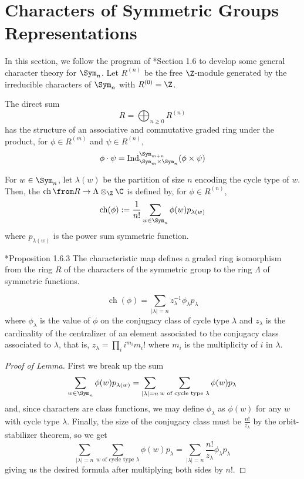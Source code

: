 \documentclass[11pt,leqno,oneside]{amsart}
\numberwithin{thm}{section}
\newcommand{\sym}{\Lambda}
\newcommand{\ch}{\operatorname{ch}}
\newcommand{\Ind}{\operatorname{Ind}}
\begin{document}
\section{Characters of Symmetric Groups Representations}
In this section, we follow the program of \cite{manivel}*{Section
  1.6} to develop some general character theory for \(\Sym_n\). Let
\(R^{(n)}\) be the free \(\Z\)-module generated by the 
irreducible 
characters of \(\Sym_n\) with \(R^{(0)} = \Z\).
\begin{prop}
  The direct sum \[
    R = \bigoplus_{n \geq 0} R^{(n)}
  \]
  has the structure of an associative and commutative graded ring
  under the product, for \(\phi \in R^{(m)}\) and \(\psi \in R^{(n)}\),
  \[
    \phi \cdot \psi = \Ind_{\Sym_m \times \Sym_n}^{\Sym_{m+n}}(\phi
    \times \psi)
  \]
\end{prop}
\begin{defn}
  For \(w \in \Sym_n\), let \(\lambda(w)\) be the partition of size
  \(n\) encoding the cycle type of \(w\). Then, the  \(\ch \from R \to \sym \otimes_\Z 
  \C\) is defined by, for \(\phi \in R^{(n)}\), \[
    \ch(\phi) := \frac{1}{n!} \sum_{w \in \Sym_n} \phi(w) p_{\lambda(w)}
  \]
  where \(p_{\lambda(w)}\) is the power sum symmetric function.
\end{defn}
\begin{thm}
  \cite{manivel}*{Proposition 1.6.3} The characteristic map defines a
  graded ring isomorphism from the 
  ring \(R\) of the characters of the symmetric group to the ring
  \(\sym\) of symmetric functions.
\end{thm}
\begin{lem}
  \[
    \ch(\phi) = \sum_{|\lambda|=n} z_\lambda^{-1} \phi_\lambda p_\lambda
  \]
  where \(\phi_\lambda\) is the value of \(\phi\) on the conjugacy
  class of cycle type \(\lambda\) and \(z_{\lambda}\) is the
  cardinality of the centralizer of an 
  element associated to the conjugacy class associated to
  \(\lambda\), that is, \(z_{\lambda} = \prod_{i} i^{m_i} m_i!\) where
  \(m_i\) is the multiplicity of \(i\) in \(\lambda\).
\end{lem}
\begin{proof}[Proof of Lemma]
  First we break up the sum \[
    \sum_{w \in \Sym_n} \phi(w) p_{\lambda(w)} = \sum_{|\lambda|=n}
    \sum_{w \text{ of cycle type }\lambda}  \phi(w) p_\lambda
  \]
  and, since characters are class functions, we may define
  \(\phi_\lambda\) as \(\phi(w)\) for any \(w\) with cycle type
  \(\lambda\). Finally, the size of the conjugacy class must be
  \(\frac{n!}{z_\lambda}\) by the orbit-stabilizer theorem, so we
  get \[
    \sum_{|\lambda|=n}
    \sum_{w \text{ of cycle type }\lambda}  \phi(w) p_\lambda =
    \sum_{|\lambda| = n} \frac{n!}{z_\lambda} \phi_\lambda p_\lambda
  \]
  giving us the desired formula after multiplying both sides by \(n!\).
\end{proof}
\end{document}
